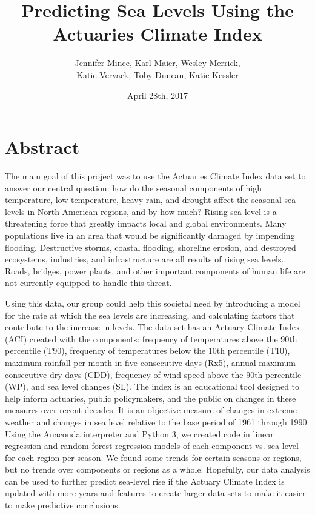 \documentclass[12pt]{report}
\title{Predicting Sea Levels Using the Actuaries Climate Index}
\date{April 28th, 2017}
\author{Jennifer Mince, Karl Maier, Wesley Merrick,\\ Katie Vervack, Toby Duncan, Katie Kessler}
\begin{document}
	\maketitle
\section*{Abstract} 
\indent	\par The main goal of this project was to use the Actuaries Climate Index data set to answer our central question: how do the seasonal components of high temperature, low temperature, heavy rain, and drought affect the seasonal sea levels in North American regions, and by how much? Rising sea level is a threatening force that greatly impacts local and global environments. Many populations live in an area that would be significantly damaged by impending flooding. Destructive storms, coastal flooding, shoreline erosion, and destroyed ecosystems, industries, and infrastructure are all results of rising sea levels. Roads, bridges, power plants, and other important components of human life are not currently equipped to handle this threat. 
		\par Using this data, our group could help this societal need by introducing a model for the rate at which the sea levels are increasing, and calculating factors that contribute to the increase in levels. The data set has an Actuary Climate Index (ACI) created with the components: frequency of temperatures above the 90th percentile (T90), frequency of temperatures below the 10th percentile (T10), maximum rainfall per month in five consecutive days (Rx5), annual maximum consecutive dry days (CDD), frequency of wind speed above the 90th percentile (WP), and sea level changes (SL). The index is an educational tool designed to help inform actuaries, public policymakers, and the public on changes in these measures over recent decades.  It is an objective measure of changes in extreme weather and changes in sea level relative to the base period of 1961 through 1990. Using the Anaconda interpreter and Python 3, we created code in linear regression and random forest regression models of each component vs. sea level for each region per season. We found some trends for certain seasons or regions, but no trends over components or regions as a whole. Hopefully, our data analysis can be used to further predict sea-level rise if the Actuary Climate Index is updated with more years and features to create larger data sets to make it easier to make predictive conclusions. 
\end{document}
